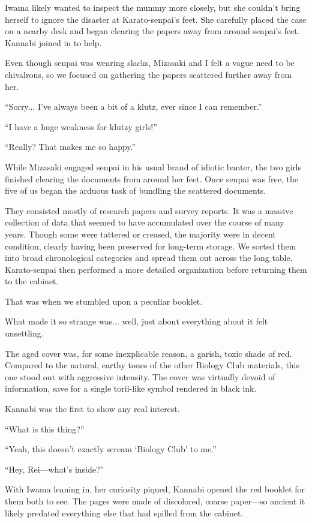 \documentclass[
    a4paper,
    12pt,
    twoside,
    openany,
    UTF8,
    fontset=windows
]{ctexbook}
\begin{document}
Iwama likely wanted to inspect the mummy more closely, but she couldn't bring herself to ignore the disaster at Karato-senpai's feet. She carefully placed the case on a nearby desk and began clearing the papers away from around senpai's feet. Kannabi joined in to help.

Even though senpai was wearing slacks, Mizasaki and I felt a vague need to be chivalrous, so we focused on gathering the papers scattered further away from her.

``Sorry... I've always been a bit of a klutz, ever since I can remember.''

``I have a huge weakness for klutzy girls!''

``Really? That makes me so happy.''

While Mizasaki engaged senpai in his usual brand of idiotic banter, the two girls finished clearing the documents from around her feet. Once senpai was free, the five of us began the arduous task of bundling the scattered documents.

They consisted mostly of research papers and survey reports. It was a massive collection of data that seemed to have accumulated over the course of many years. Though some were tattered or creased, the majority were in decent condition, clearly having been preserved for long-term storage. We sorted them into broad chronological categories and spread them out across the long table. Karato-senpai then performed a more detailed organization before returning them to the cabinet.

That was when we stumbled upon a peculiar booklet.

What made it so strange was... well, just about everything about it felt unsettling.

The aged cover was, for some inexplicable reason, a garish, toxic shade of red. Compared to the natural, earthy tones of the other Biology Club materials, this one stood out with aggressive intensity. The cover was virtually devoid of information, save for a single torii-like symbol rendered in black ink.

Kannabi was the first to show any real interest.

``What is this thing?''

``Yeah, this doesn't exactly scream `Biology Club' to me.''

``Hey, Rei---what's inside?''

With Iwama leaning in, her curiosity piqued, Kannabi opened the red booklet for them both to see. The pages were made of discolored, coarse paper---so ancient it likely predated everything else that had spilled from the cabinet.
\end{document}
